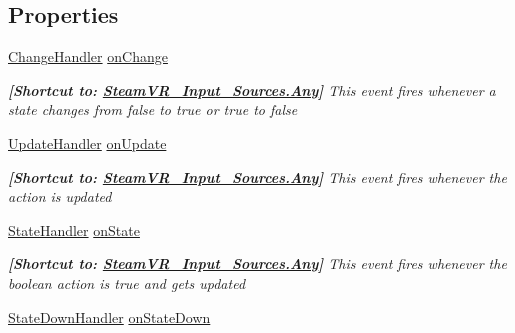 \subsection*{Properties}
\begin{DoxyCompactItemize}
\item 
\mbox{\hyperlink{class_valve_1_1_v_r_1_1_steam_v_r___action___boolean_a9dbdff089d05d822688005fa19fef120}{Change\+Handler}} \mbox{\hyperlink{class_valve_1_1_v_r_1_1_steam_v_r___action___boolean_a1d971e8340acfb9075164a5390cda27a}{on\+Change}}
\begin{DoxyCompactList}\small\item\em {\bfseries{\mbox{[}Shortcut to\+: \mbox{\hyperlink{namespace_valve_1_1_v_r_a82e5bf501cc3aa155444ee3f0662853faed36a1ef76a59ee3f15180e0441188ad}{Steam\+V\+R\+\_\+\+Input\+\_\+\+Sources.\+Any}}\mbox{]}}} This event fires whenever a state changes from false to true or true to false \end{DoxyCompactList}\item 
\mbox{\hyperlink{class_valve_1_1_v_r_1_1_steam_v_r___action___boolean_ab9ee21a88a5d5d23603465c55796fcf5}{Update\+Handler}} \mbox{\hyperlink{class_valve_1_1_v_r_1_1_steam_v_r___action___boolean_abacac827162ffe15b71a5ac0f848baee}{on\+Update}}
\begin{DoxyCompactList}\small\item\em {\bfseries{\mbox{[}Shortcut to\+: \mbox{\hyperlink{namespace_valve_1_1_v_r_a82e5bf501cc3aa155444ee3f0662853faed36a1ef76a59ee3f15180e0441188ad}{Steam\+V\+R\+\_\+\+Input\+\_\+\+Sources.\+Any}}\mbox{]}}} This event fires whenever the action is updated \end{DoxyCompactList}\item 
\mbox{\hyperlink{class_valve_1_1_v_r_1_1_steam_v_r___action___boolean_a59bb3ba4454fcebc2f1d2ddd661dd38f}{State\+Handler}} \mbox{\hyperlink{class_valve_1_1_v_r_1_1_steam_v_r___action___boolean_ae12c666fba19bc6ed701a72bc8cdc9ed}{on\+State}}
\begin{DoxyCompactList}\small\item\em {\bfseries{\mbox{[}Shortcut to\+: \mbox{\hyperlink{namespace_valve_1_1_v_r_a82e5bf501cc3aa155444ee3f0662853faed36a1ef76a59ee3f15180e0441188ad}{Steam\+V\+R\+\_\+\+Input\+\_\+\+Sources.\+Any}}\mbox{]}}} This event fires whenever the boolean action is true and gets updated \end{DoxyCompactList}\item 
\mbox{\hyperlink{class_valve_1_1_v_r_1_1_steam_v_r___action___boolean_a529f46e4f0459edb2641bbb382d10614}{State\+Down\+Handler}} \mbox{\hyperlink{class_valve_1_1_v_r_1_1_steam_v_r___action___boolean_af66c5068d4d64878a5ae1b5fc0a70973}{on\+State\+Down}}

\end{DoxyCompactItemize}

